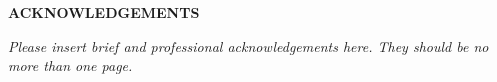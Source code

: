 

\begin{center}

\end{center}
\begin{center}

{\bf\fontsize{14pt}{14.5pt}\selectfont \uppercase{Acknowledgements}}\\\vspace{1cm}
\end{center}






\textit{Please insert brief and professional acknowledgements here. They should be no more than one page.} %








